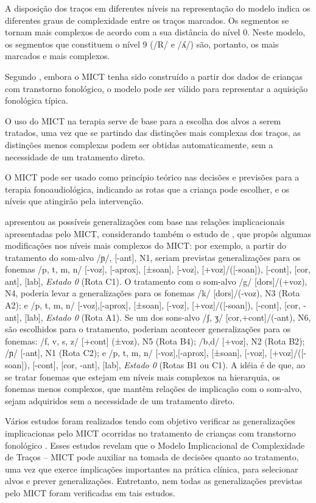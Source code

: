 \documentclass[output=paper,colorlinks,citecolor=brown,booklanguage=portuguese]{langscibook}
\begin{document}
A disposição dos traços em diferentes níveis na representação do modelo indica os diferentes graus de complexidade entre os traços marcados. Os segmentos se tornam mais complexos de acordo com a sua distância do nível 0. Neste modelo, os segmentos que constituem o nível 9 (/R/ e /ʎ/) são, portanto, os mais marcados e mais complexos.

Segundo \citet{Mota1996}, embora o MICT tenha sido construído a partir dos dados de crianças com transtorno fonológico, o modelo pode ser válido para representar a aquisição fonológica típica. 

O uso do MICT na terapia serve de base para a escolha dos alvos a serem tratados, uma vez que se partindo das distinções mais complexas dos traços, as distinções menos complexas podem ser obtidas automaticamente, sem a necessidade de um tratamento direto.

O MICT pode ser usado como princípio teórico nas decisões e previsões para a terapia fonoaudiológica, indicando as rotas que a criança pode escolher, e os níveis que atingirão pela intervenção.

\citet{Brancalioni2015} apresentou as possíveis generalizações com base nas relações implicacionais apresentadas pelo MICT, considerando também o estudo de \citet{Rangel1998}, que propôs algumas modificações nos níveis mais complexos do MICT: por exemplo, a partir do tratamento do som-alvo /ɲ/, [-ant], N1, seriam previstas generalizações para os fonemas /p, t, m, n/ [-voz], [-aprox], [±soan], [-voz], [+voz]/([-soan]), [-cont], [cor, ant], [lab], \emph{Estado 0} (Rota C1). O tratamento com o som-alvo /g/ [dors]/(+voz), N4, poderia levar a generalizações para os fonemas /k/ [dors]/(-voz), N3 (Rota A2); e /p, t, m, n/ [-voz],[-aprox], [±soan], [-voz], [+voz]/([-soan]), [-cont], [cor, -ant], [lab], \emph{Estado 0} (Rota A1). Se um dos sons-alvo /ʃ, ʒ/ [cor,+cont]/(-ant), N6, são escolhidos para o tratamento, poderiam acontecer generalizações para os fonemas: /f, v, s, z/ [+cont] (±voz), N5 (Rota B4); /b,d/ [+voz], N2 (Rota B2); /ɲ/ [-ant], N1 (Rota C2); e /p, t, m, n/ [-voz],[-aprox], [±soan], [-voz], [+voz]/([-soan]), [-cont], [cor, -ant], [lab], \emph{Estado 0} (Rotas B1 ou C1).  A idéia é de que, ao se tratar fonemas que estejam em níveis mais complexos na hierarquia, os fonemas menos complexos, que mantêm relações de implicação com o som-alvo, sejam adquiridos sem a necessidade de um tratamento direto.

Vários estudos foram realizados tendo com objetivo verificar as generalizações implicacionas pelo MICT ocorridas no tratamento de crianças com transtorno fonológico \citep{KeskeSoares1998, KeskeSoares2001, Schaefer1999, Mota2005, AlmeidaSpindola2007, SilvaBarberena2008}. Esses estudos revelam que o Modelo Implicacional de Complexidade de Traços -- MICT pode auxiliar na tomada de decisões quanto ao tratamento, uma vez que exerce implicações importantes na prática clínica, para selecionar alvos e prever generalizações. Entretanto, nem todas as generalizações previstas pelo MICT foram verificadas em tais estudos.
\end{document}
